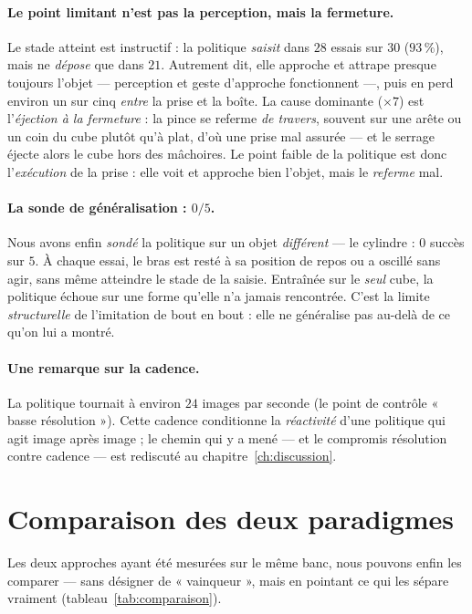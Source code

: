 \paragraph{Le point limitant n'est pas la perception, mais la fermeture.} Le stade atteint est instructif : la politique \emph{saisit} dans $28$ essais sur $30$ ($93\,\%$), mais ne \emph{dépose} que dans $21$. Autrement dit, elle approche et attrape presque toujours l'objet --- perception et geste d'approche fonctionnent ---, puis en perd environ un sur cinq \emph{entre} la prise et la boîte. La cause dominante ($\times 7$) est l'\emph{éjection à la fermeture} : la pince se referme \emph{de travers}, souvent sur une arête ou un coin du cube plutôt qu'à plat, d'où une prise mal assurée --- et le serrage éjecte alors le cube hors des mâchoires. Le point faible de la politique est donc l'\emph{exécution} de la prise : elle voit et approche bien l'objet, mais le \emph{referme} mal.

\paragraph{La sonde de généralisation : $0/5$.} Nous avons enfin \emph{sondé} la politique sur un objet \emph{différent} --- le cylindre : $0$ succès sur $5$. À chaque essai, le bras est resté à sa position de repos ou a oscillé sans agir, sans même atteindre le stade de la saisie. Entraînée sur le \emph{seul} cube, la politique échoue sur une forme qu'elle n'a jamais rencontrée. C'est la limite \emph{structurelle} de l'imitation de bout en bout : elle ne généralise pas au-delà de ce qu'on lui a montré.

\paragraph{Une remarque sur la cadence.} La politique tournait à environ $24$ images par seconde (le point de contrôle « basse résolution »). Cette cadence conditionne la \emph{réactivité} d'une politique qui agit image après image ; le chemin qui y a mené --- et le compromis résolution contre cadence --- est rediscuté au chapitre~\ref{ch:discussion}.

\section{Comparaison des deux paradigmes}
\label{sec:eval-comparaison}

Les deux approches ayant été mesurées sur le même banc, nous pouvons enfin les comparer --- sans désigner de « vainqueur », mais en pointant ce qui les sépare vraiment (tableau~\ref{tab:comparaison}).

